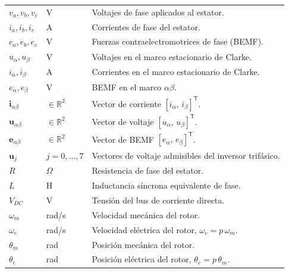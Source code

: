 \documentclass[../Tesis_JALS_Maestria.tex]{subfiles}
\begin{document}
{\begin{longtable}{
		>{\centering\arraybackslash}p{3cm}
		>{\centering\arraybackslash}p{4cm}
		p{8cm}
	}
	$v_a, v_b, v_c$ & V & Voltajes de fase aplicados al estator. \\

	$i_a, i_b, i_c$ & A & Corrientes de fase del estator. \\

	$e_a, e_b, e_c$ & V & Fuerzas contraelectromotrices de fase (BEMF). \\

	$u_\alpha, u_\beta$ & V & Voltajes en el marco estacionario de Clarke. \\

	$i_\alpha, i_\beta$ & A & Corrientes en el marco estacionario de Clarke. \\

	$e_\alpha, e_\beta$ & V & BEMF en el marco $\alpha\beta$. \\

	$\mathbf{i}_{\alpha\beta}$ & $\in\mathbb{R}^2$ & Vector de corriente $[i_\alpha,\,i_\beta]^{\mathsf{T}}$. \\

	$\mathbf{u}_{\alpha\beta}$ & $\in\mathbb{R}^2$ & Vector de voltaje $[u_\alpha,\,u_\beta]^{\mathsf{T}}$. \\

	$\mathbf{e}_{\alpha\beta}$ & $\in\mathbb{R}^2$ & Vector de BEMF $[e_\alpha,\,e_\beta]^{\mathsf{T}}$. \\

	$\mathbf{u}_j$ & $j=0,\ldots,7$ & Vectores de voltaje admisibles del inversor trifásico. \\

	$R$ & $\Omega$ & Resistencia de fase del estator. \\

	$L$ & H & Inductancia síncrona equivalente de fase. \\

	$V_{DC}$ & V & Tensión del bus de corriente directa. \\

	$\omega_m$ & rad/s & Velocidad mecánica del rotor. \\

	$\omega_e$ & rad/s & Velocidad eléctrica del rotor, $\omega_e = p\,\omega_m$. \\

	$\theta_m$ & rad & Posición mecánica del rotor. \\

	$\theta_e$ & rad & Posición eléctrica del rotor, $\theta_e = p\,\theta_m$. \\


\end{longtable}}
\end{document}
